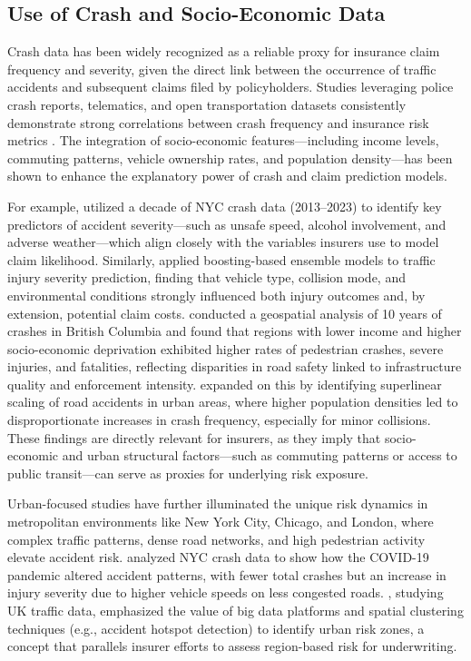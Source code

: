 \documentclass[
  number,
  review,
  3p]{elsarticle}
\begin{document}
\subsection{\texorpdfstring{\textbf{Use of Crash and Socio-Economic
Data}}{Use of Crash and Socio-Economic Data}}\label{use-of-crash-and-socio-economic-data}

Crash data has been widely recognized as a reliable proxy for insurance
claim frequency and severity, given the direct link between the
occurrence of traffic accidents and subsequent claims filed by
policyholders. Studies leveraging police crash reports, telematics, and
open transportation datasets consistently demonstrate strong
correlations between crash frequency and insurance risk metrics
\citep{takale}. The integration of socio-economic features---including
income levels, commuting patterns, vehicle ownership rates, and
population density---has been shown to enhance the explanatory power of
crash and claim prediction models.

For example, \citet{adeniyi} utilized a decade of NYC crash data
(2013--2023) to identify key predictors of accident severity---such as
unsafe speed, alcohol involvement, and adverse weather---which align
closely with the variables insurers use to model claim likelihood.
Similarly, \citet{dong} applied boosting-based ensemble models to
traffic injury severity prediction, finding that vehicle type, collision
mode, and environmental conditions strongly influenced both injury
outcomes and, by extension, potential claim costs. \citet{brubacher}
conducted a geospatial analysis of 10 years of crashes in British
Columbia and found that regions with lower income and higher
socio-economic deprivation exhibited higher rates of pedestrian crashes,
severe injuries, and fatalities, reflecting disparities in road safety
linked to infrastructure quality and enforcement intensity.
\citet{cabrera} expanded on this by identifying superlinear scaling of
road accidents in urban areas, where higher population densities led to
disproportionate increases in crash frequency, especially for minor
collisions. These findings are directly relevant for insurers, as they
imply that socio-economic and urban structural factors---such as
commuting patterns or access to public transit---can serve as proxies
for underlying risk exposure.

Urban-focused studies have further illuminated the unique risk dynamics
in metropolitan environments like New York City, Chicago, and London,
where complex traffic patterns, dense road networks, and high pedestrian
activity elevate accident risk. \citet{adeniyi} analyzed NYC crash data
to show how the COVID-19 pandemic altered accident patterns, with fewer
total crashes but an increase in injury severity due to higher vehicle
speeds on less congested roads. \citet{feng}, studying UK traffic data,
emphasized the value of big data platforms and spatial clustering
techniques (e.g., accident hotspot detection) to identify urban risk
zones, a concept that parallels insurer efforts to assess region-based
risk for underwriting.
\end{document}
